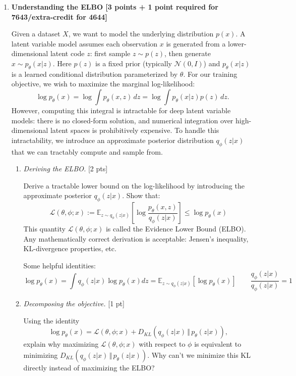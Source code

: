 \documentclass[11pt,english]{article}
\begin{document}
\begin{enumerate}
    \item \textbf{Understanding the ELBO [3 points + 1 point required for 7643/extra-credit for 4644]}
    
    Given a dataset $X$, we want to model the underlying distribution $p(x)$. A latent variable model assumes each observation $x$ is generated from a lower-dimensional latent code $z$: first sample $z \sim p(z)$, then generate $x \sim p_\theta(x|z)$. Here $p(z)$ is a fixed prior (typically $\mathcal{N}(0, I)$) and $p_\theta(x|z)$ is a learned conditional distribution parameterized by $\theta$. 
    For our training objective, we wish to maximize the marginal log-likelihood:
    \[
    \log p_\theta(x) = \log \int p_\theta(x, z)\,dz = \log \int p_\theta(x|z)p(z)\,dz.
    \]
    \noindent However, computing this integral is intractable for deep latent variable models: there is no closed-form solution, and numerical integration over high-dimensional latent spaces is prohibitively expensive. To handle this intractability, we introduce an approximate posterior distribution $q_\phi(z|x)$ that we can tractably compute and sample from.
    \begin{enumerate}
      \item \textit{Deriving the ELBO.} [2 pts]
      
      Derive a tractable lower bound on the log-likelihood by introducing the approximate posterior $q_\phi(z|x)$. Show that:
        \[
            \mathcal{L}(\theta, \phi; x) := \mathbb{E}_{z \sim q_\phi(z|x)}\left[\log \frac{p_\theta(x, z)}{q_\phi(z|x)}\right] \leq \log p_\theta(x)
        \]
        This quantity $\mathcal{L}(\theta, \phi; x)$ is called the Evidence Lower Bound (ELBO). Any mathematically correct derivation is acceptable: Jensen's inequality, KL-divergence properties, etc.
    
    
        Some helpful identities:
        \[
        \log p_\theta(x) = \int q_\phi(z|x) \log p_\theta(x) dz = \mathbb{E}_{z \sim q_\phi(z|x)}[\log p_\theta(x)]
        \qquad
        \frac{q_\phi(z|x)}{q_\phi(z|x)} = 1
        \]
        
      \item \textit{Decomposing the objective.} [1 pt]

        Using the identity
        \[
        \log p_\theta(x) = \mathcal{L}(\theta,\phi;x) 
            + D_{KL}(q_\phi(z|x) \,\Vert\, p_\theta(z|x)),
        \]
        explain why maximizing $\mathcal{L}(\theta,\phi;x)$ with respect to $\phi$
        is equivalent to minimizing $D_{KL}(q_\phi(z|x)\,\Vert\, p_\theta(z|x))$.
        Why can't we minimize this KL directly instead of maximizing the ELBO?
        

\end{enumerate}
\end{enumerate}
\end{document}

